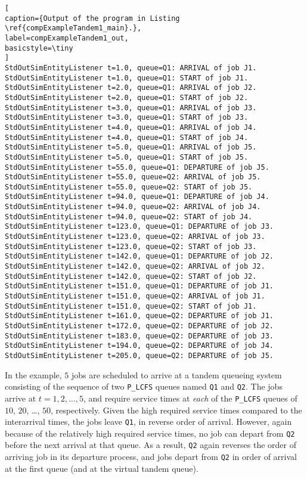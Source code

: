 \documentclass[12pt]{book}
\begin{document}
\begin{lstlisting}[
caption={Output of the program in Listing \ref{compExampleTandem1_main}.},
label=compExampleTandem1_out,
basicstyle=\tiny
]
StdOutSimEntityListener t=1.0, queue=Q1: ARRIVAL of job J1.
StdOutSimEntityListener t=1.0, queue=Q1: START of job J1.
StdOutSimEntityListener t=2.0, queue=Q1: ARRIVAL of job J2.
StdOutSimEntityListener t=2.0, queue=Q1: START of job J2.
StdOutSimEntityListener t=3.0, queue=Q1: ARRIVAL of job J3.
StdOutSimEntityListener t=3.0, queue=Q1: START of job J3.
StdOutSimEntityListener t=4.0, queue=Q1: ARRIVAL of job J4.
StdOutSimEntityListener t=4.0, queue=Q1: START of job J4.
StdOutSimEntityListener t=5.0, queue=Q1: ARRIVAL of job J5.
StdOutSimEntityListener t=5.0, queue=Q1: START of job J5.
StdOutSimEntityListener t=55.0, queue=Q1: DEPARTURE of job J5.
StdOutSimEntityListener t=55.0, queue=Q2: ARRIVAL of job J5.
StdOutSimEntityListener t=55.0, queue=Q2: START of job J5.
StdOutSimEntityListener t=94.0, queue=Q1: DEPARTURE of job J4.
StdOutSimEntityListener t=94.0, queue=Q2: ARRIVAL of job J4.
StdOutSimEntityListener t=94.0, queue=Q2: START of job J4.
StdOutSimEntityListener t=123.0, queue=Q1: DEPARTURE of job J3.
StdOutSimEntityListener t=123.0, queue=Q2: ARRIVAL of job J3.
StdOutSimEntityListener t=123.0, queue=Q2: START of job J3.
StdOutSimEntityListener t=142.0, queue=Q1: DEPARTURE of job J2.
StdOutSimEntityListener t=142.0, queue=Q2: ARRIVAL of job J2.
StdOutSimEntityListener t=142.0, queue=Q2: START of job J2.
StdOutSimEntityListener t=151.0, queue=Q1: DEPARTURE of job J1.
StdOutSimEntityListener t=151.0, queue=Q2: ARRIVAL of job J1.
StdOutSimEntityListener t=151.0, queue=Q2: START of job J1.
StdOutSimEntityListener t=161.0, queue=Q2: DEPARTURE of job J1.
StdOutSimEntityListener t=172.0, queue=Q2: DEPARTURE of job J2.
StdOutSimEntityListener t=183.0, queue=Q2: DEPARTURE of job J3.
StdOutSimEntityListener t=194.0, queue=Q2: DEPARTURE of job J4.
StdOutSimEntityListener t=205.0, queue=Q2: DEPARTURE of job J5.
\end{lstlisting}

In the example, $5$ jobs are scheduled to arrive at
  a tandem queueing system consisting of
  the sequence of
  two \lstinline|P_LCFS| queues
  named
  \lstinline|Q1| and \lstinline|Q2|.
The jobs arrive at $t=1, 2, \dots, 5$,
  and require service times at {\em each\/} of the \lstinline|P_LCFS| queues
  of $10$, $20$, \ldots, $50$, respectively.
Given the high required service times compared to the
  interarrival times,
  the jobs leave \lstinline|Q1|,
  in reverse order of arrival.
However, again because of the relatively high required service times,
  no job can depart from \lstinline|Q2| before the next arrival
  at that queue.
As a result,
  \lstinline|Q2| again reverses the order of arriving job in its departure
  process, and jobs depart from \lstinline|Q2| in order of arrival at the first queue
  (and at the virtual tandem queue).
\end{document}
